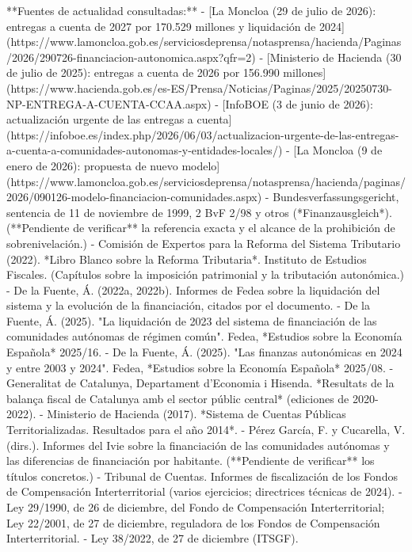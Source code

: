 \documentclass[10pt,a4paper]{article}
\begin{document}
{**Fuentes de actualidad consultadas:**
- [La Moncloa (29 de julio de 2026): entregas a cuenta de 2027 por 170.529 millones y liquidación de 2024](https://www.lamoncloa.gob.es/serviciosdeprensa/notasprensa/hacienda/Paginas/2026/290726-financiacion-autonomica.aspx?qfr=2)
- [Ministerio de Hacienda (30 de julio de 2025): entregas a cuenta de 2026 por 156.990 millones](https://www.hacienda.gob.es/es-ES/Prensa/Noticias/Paginas/2025/20250730-NP-ENTREGA-A-CUENTA-CCAA.aspx)
- [InfoBOE (3 de junio de 2026): actualización urgente de las entregas a cuenta](https://infoboe.es/index.php/2026/06/03/actualizacion-urgente-de-las-entregas-a-cuenta-a-comunidades-autonomas-y-entidades-locales/)
- [La Moncloa (9 de enero de 2026): propuesta de nuevo modelo](https://www.lamoncloa.gob.es/serviciosdeprensa/notasprensa/hacienda/paginas/2026/090126-modelo-financiacion-comunidades.aspx)
- Bundesverfassungsgericht, sentencia de 11 de noviembre de 1999, 2 BvF 2/98 y otros (*Finanzausgleich*). (**Pendiente de verificar** la referencia exacta y el alcance de la prohibición de sobrenivelación.)
- Comisión de Expertos para la Reforma del Sistema Tributario (2022). *Libro Blanco sobre la Reforma Tributaria*. Instituto de Estudios Fiscales. (Capítulos sobre la imposición patrimonial y la tributación autonómica.)
- De la Fuente, Á. (2022a, 2022b). Informes de Fedea sobre la liquidación del sistema y la evolución de la financiación, citados por el documento.
- De la Fuente, Á. (2025). "La liquidación de 2023 del sistema de financiación de las comunidades autónomas de régimen común". Fedea, *Estudios sobre la Economía Española* 2025/16.
- De la Fuente, Á. (2025). "Las finanzas autonómicas en 2024 y entre 2003 y 2024". Fedea, *Estudios sobre la Economía Española* 2025/08.
- Generalitat de Catalunya, Departament d'Economia i Hisenda. *Resultats de la balança fiscal de Catalunya amb el sector públic central* (ediciones de 2020-2022).
- Ministerio de Hacienda (2017). *Sistema de Cuentas Públicas Territorializadas. Resultados para el año 2014*.
- Pérez García, F. y Cucarella, V. (dirs.). Informes del Ivie sobre la financiación de las comunidades autónomas y las diferencias de financiación por habitante. (**Pendiente de verificar** los títulos concretos.)
- Tribunal de Cuentas. Informes de fiscalización de los Fondos de Compensación Interterritorial (varios ejercicios; directrices técnicas de 2024).
- Ley 29/1990, de 26 de diciembre, del Fondo de Compensación Interterritorial; Ley 22/2001, de 27 de diciembre, reguladora de los Fondos de Compensación Interterritorial.
- Ley 38/2022, de 27 de diciembre (ITSGF).

}
\end{document}

